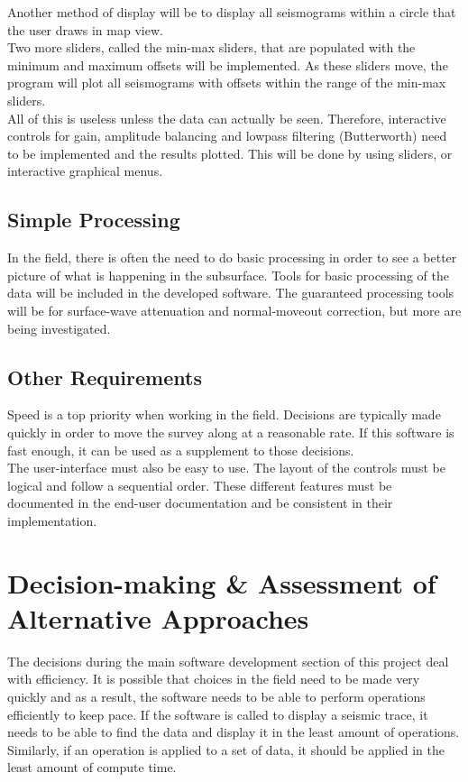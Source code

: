 \documentclass[11pt]{article}
\begin{document}
Another method of display will be to display all seismograms within a circle that the user draws in map view. \\

Two more sliders, called the min-max sliders, that are populated with the minimum and maximum offsets will be implemented. As these sliders move, the program will plot all seismograms with offsets within the range of the min-max sliders. \\

All of this is useless unless the data can actually be seen. Therefore, interactive controls for gain, amplitude balancing and lowpass filtering (Butterworth) need to be implemented and the results plotted. This will be done by using sliders, or interactive graphical menus.

\subsection{Simple Processing}

In the field, there is often the need to do basic processing in order to see a better picture of what is happening in the subsurface. Tools for basic processing of the data will be included in the developed software. The guaranteed processing tools will be for surface-wave attenuation and normal-moveout correction, but more are being investigated.

\subsection{Other Requirements}

Speed is a top priority when working in the field. Decisions are typically made quickly in order to move the survey along at a reasonable rate. If this software is fast enough, it can be used as a supplement to those decisions. \\

The user-interface must also be easy to use. The layout of the controls must be logical and follow a sequential order. These different features must be documented in the end-user documentation and be consistent in their implementation. 

\section{Decision-making \& Assessment of Alternative Approaches}

The decisions during the main software development section of this project deal with efficiency. It is possible that choices in the field need to be made very quickly and as a result, the software needs to be able to perform operations efficiently to keep pace. If the software is called to display a seismic trace, it needs to be able to find the data and display it in the least amount of operations. Similarly, if an operation is applied to a set of data, it should be applied in the least amount of compute time. \\
\end{document}
